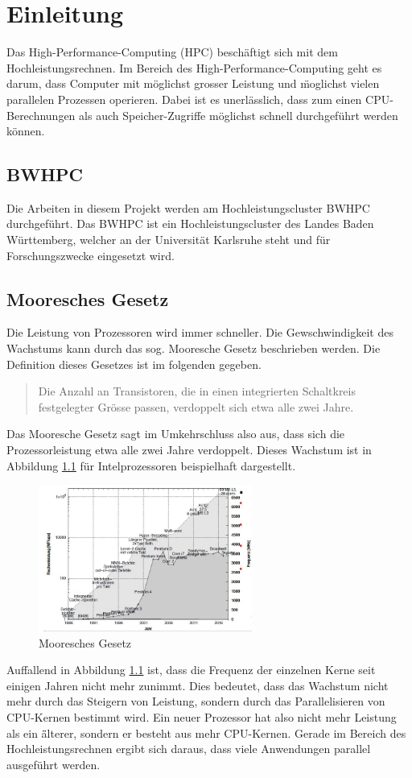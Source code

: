 \chapter{Einleitung}
\label{sec:einl}
Das High-Performance-Computing (HPC) besch\"aftigt sich mit dem Hochleistungsrechnen. Im Bereich des High-Performance-Computing geht es darum, dass Computer mit m\"oglichst grosser Leistung und \"moglichst vielen parallelen Prozessen operieren. Dabei ist es unerl\"asslich, dass zum einen CPU-Berechnungen als auch Speicher-Zugriffe m\"oglichst schnell durchgef\"uhrt werden k\"onnen.
\section{BWHPC}
Die Arbeiten in diesem Projekt werden am Hochleistungscluster BWHPC durchgef\"uhrt. Das BWHPC ist ein Hochleistungscluster des Landes Baden W\"urttemberg, welcher an der Universit\"at Karlsruhe steht und f\"ur Forschungszwecke eingesetzt wird.
\section{Mooresches Gesetz}
Die Leistung von Prozessoren wird immer schneller. Die Gewschwindigkeit des Wachstums kann durch das sog. Mooresche Gesetz beschrieben werden. Die Definition dieses Gesetzes ist im folgenden gegeben.

\begin{quote}Die Anzahl an Transistoren, die in einen integrierten Schaltkreis festgelegter Gr\"osse passen, verdoppelt sich etwa alle zwei Jahre.~\cite{Schanze.25.02.2016}\end{quote}
Das Mooresche Gesetz sagt im Umkehrschluss also aus, dass sich die Prozessorleistung etwa alle zwei Jahre verdoppelt. Dieses Wachstum ist in Abbildung \ref{fig:moore} f\"ur Intelprozessoren beispielhaft dargestellt.

\begin{figure}[h]
	\centering
	\includegraphics[width=7cm]{fig/moore.JPG}
	\caption{Mooresches Gesetz}
	\label{fig:moore}
\end{figure}
Auffallend in Abbildung \ref{fig:moore} ist, dass die Frequenz der einzelnen Kerne seit einigen Jahren nicht mehr zunimmt. Dies bedeutet, dass das Wachstum nicht mehr durch das Steigern von Leistung, sondern durch das Parallelisieren von CPU-Kernen bestimmt wird. Ein neuer Prozessor hat also nicht mehr Leistung als ein \"älterer, sondern er besteht aus mehr CPU-Kernen. Gerade im Bereich des Hochleistungsrechnen ergibt sich daraus, dass viele Anwendungen parallel ausgef\"uhrt werden.
